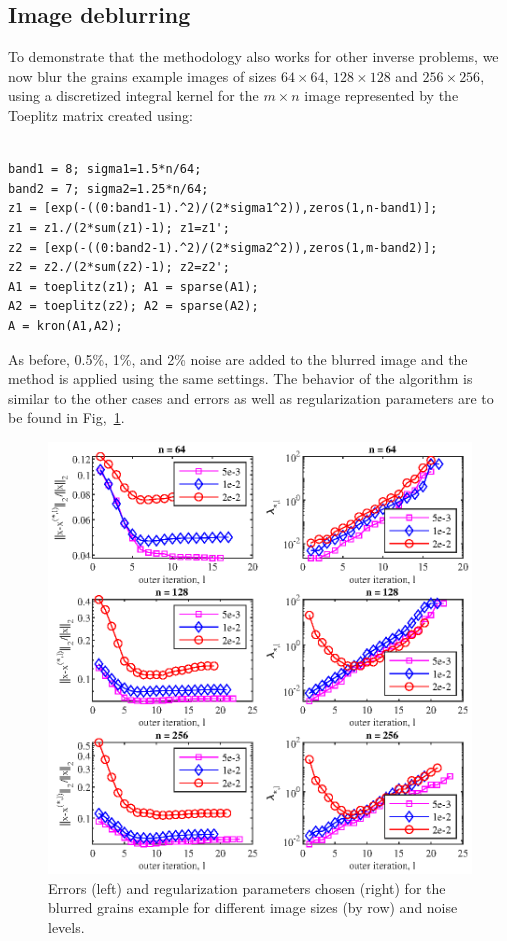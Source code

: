 \subsection{Image deblurring}
To demonstrate that the methodology also works for other inverse problems, we now blur the grains example images of sizes $64 \times 64$, $128 \times 128$ and $256 \times 256$, using a discretized integral kernel for the $m \times n$ image represented by the Toeplitz matrix created using:
\begin{verbatim}

band1 = 8; sigma1=1.5*n/64; 
band2 = 7; sigma2=1.25*n/64;
z1 = [exp(-((0:band1-1).^2)/(2*sigma1^2)),zeros(1,n-band1)];
z1 = z1./(2*sum(z1)-1); z1=z1';
z2 = [exp(-((0:band2-1).^2)/(2*sigma2^2)),zeros(1,m-band2)];
z2 = z2./(2*sum(z2)-1); z2=z2';
A1 = toeplitz(z1); A1 = sparse(A1); 
A2 = toeplitz(z2); A2 = sparse(A2);
A = kron(A1,A2);

\end{verbatim}
As before, 0.5\%, 1\%, and 2\% noise are added to the blurred image and the method is applied using the same settings. The behavior of the algorithm is similar to the other cases and errors as well as regularization parameters are to be found in Fig,~\ref{fig:grains_blurring_errs_and_reg_params}.
\begin{figure}[htbp]
\begin{center}
\includegraphics{figures/grains_blurring_errs_and_reg_params}
\caption{Errors (left) and regularization parameters chosen (right) for the blurred grains example for different image sizes (by row) and noise levels.}
\label{fig:grains_blurring_errs_and_reg_params}
\end{center}
\end{figure}

